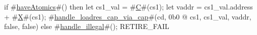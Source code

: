 if #\hyperref[sailRISCVzhaveAtomics]{haveAtomics}#() then {
  let cs1_val = #\hyperref[sailRISCVzC]{C}#(cs1);
  let vaddr = cs1_val.address + #\hyperref[sailRISCVzX]{X}#(cs1);
  #\hyperref[sailRISCVzhandlezyloadreszycapzyviazycap]{handle\_loadres\_cap\_via\_cap}#(cd, 0b0 @ cs1, cs1_val, vaddr, false, false)
} else {
  #\hyperref[sailRISCVzhandlezyillegal]{handle\_illegal}#();
  RETIRE_FAIL
}
